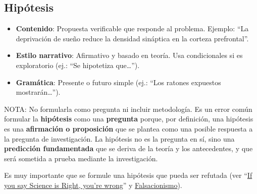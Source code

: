 \documentclass[
  10pt]{article}
\begin{document}
\subsection{Hipótesis}\label{hipuxf3tesis}

\begin{tcolorbox}[enhanced jigsaw, colframe=quarto-callout-tip-color-frame, opacitybacktitle=0.6, coltitle=black, colback=white, left=2mm, breakable, bottomtitle=1mm, toptitle=1mm, titlerule=0mm, toprule=.15mm, opacityback=0, rightrule=.15mm, bottomrule=.15mm, colbacktitle=quarto-callout-tip-color!10!white, arc=.35mm, leftrule=.75mm, title=\textcolor{quarto-callout-tip-color}{\faLightbulb}\hspace{0.5em}{Tip}]

\begin{itemize}
\item
  \textbf{Contenido}: Propuesta verificable que responde al problema.
  Ejemplo: ``La deprivación de sueño reduce la densidad sináptica en la
  corteza prefrontal''.
\item
  \textbf{Estilo narrativo}: Afirmativo y basado en teoría. Usa
  condicionales si es exploratorio (ej.: ``Se hipotetiza que\ldots{}'').
\item
  \textbf{Gramática}: Presente o futuro simple (ej.: ``Los ratones
  expuestos mostrarán\ldots{}'').
\end{itemize}

\end{tcolorbox}

\begin{tcolorbox}[enhanced jigsaw, colframe=quarto-callout-tip-color-frame, opacitybacktitle=0.6, coltitle=black, colback=white, left=2mm, breakable, bottomtitle=1mm, toptitle=1mm, titlerule=0mm, toprule=.15mm, opacityback=0, rightrule=.15mm, bottomrule=.15mm, colbacktitle=quarto-callout-tip-color!10!white, arc=.35mm, leftrule=.75mm, title=\textcolor{quarto-callout-tip-color}{\faLightbulb}\hspace{0.5em}{Tip}]

NOTA: No formularla como pregunta ni incluir metodología. Es un error
común formular la \textbf{hipótesis} como una \textbf{pregunta} porque,
por definición, una hipótesis es una \textbf{afirmación o proposición}
que se plantea como una posible respuesta a la pregunta de
investigación. La hipótesis no es la pregunta en sí, sino una
\textbf{predicción fundamentada} que se deriva de la teoría y los
antecedentes, y que será sometida a prueba mediante la investigación.

Es muy importante que se formule una hipótesis que pueda ser refutada
(ver
``\href{https://www.scientificamerican.com/article/if-you-say-science-is-right-youre-wrong/}{If
you say Science is Right, you're wrong}'' y
\href{https://es.wikipedia.org/wiki/Falsacionismo}{Falsacionismo}).

\end{tcolorbox}
\end{document}

